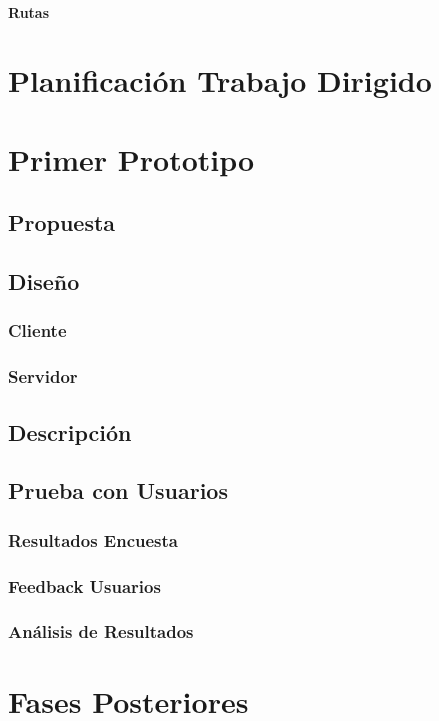 \documentclass[10pt,letterpaper]{article}
\begin{document}
\paragraph{Rutas}

\newpage
\section{Planificación Trabajo Dirigido}

\section{Primer Prototipo}

\subsection{Propuesta}

\subsection{Diseño}

\subsubsection{Cliente}

\subsubsection{Servidor}

\subsection{Descripción}

\subsection{Prueba con Usuarios}

\subsubsection{Resultados Encuesta}

\subsubsection{Feedback Usuarios}

\subsubsection{Análisis de Resultados}

\section{Fases Posteriores}
\end{document}
